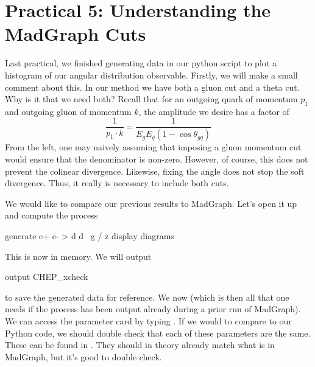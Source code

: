 \section*{Practical 5: Understanding the MadGraph Cuts }
Last practical, we finished generating data in our python script to plot a histogram of our angular distribution observable. Firstly, we will make a small comment about this. In our method  we have both a gluon cut and a theta cut. Why is it that we need both? Recall that for an outgoing quark of momentum $p_1$ and outgoing gluon of momentum $k$, the amplitude we desire has a factor of 
\begin{equation}
    \frac{1}{p_1\cdot k} =  \frac{1}{E_gE_{{q}}(1-\cos\theta_{g{q}})}
\end{equation}
From the left, one may naively assuming that imposing a gluon momentum cut would ensure that the denominator is non-zero. However, of course, this does not prevent the colinear divergence. Likewise, fixing the angle does not stop the soft divergence. Thus, it really is necessary to include both cuts. 

We would like to compare our previous results to MadGraph. Let's open it up and compute the process
\begin{codeenv}
    generate e+ e- > d d~ g / z
display diagrams
\end{codeenv}
This is now in memory. We will output
\begin{codeenv}
    output CHEP_xcheck
\end{codeenv}
to save the generated data for reference.
We now  (which is then all that one needs if the  process has been output already during a prior run of MadGraph). We can access the parameter card by typing . If we would to compare to our Python code, we should double check that each of these parameters are the same. These can be found in . They should in theory already match what is in MadGraph, but it's good to double check.

